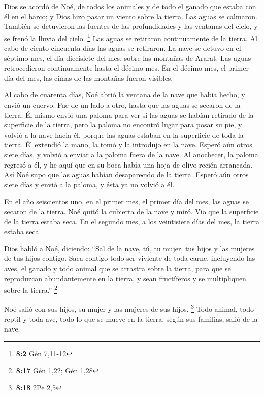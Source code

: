 \begin{paracol}{2}
 Dios se acordó de Noé, de todos los animales y de todo el
ganado que estaba con él en el barco; y Dios hizo pasar un viento sobre
la tierra. Las aguas se calmaron.  También se detuvieron
las fuentes de las profundidades y las ventanas del cielo, y se frenó la
lluvia del cielo. \footnote{\textbf{8:2} Gén 7,11-12}  Las
aguas se retiraron continuamente de la tierra. Al cabo de ciento
cincuenta días las aguas se retiraron.  La nave se detuvo
en el séptimo mes, el día diecisiete del mes, sobre las montañas de
Ararat.  Las aguas retrocedieron continuamente hasta el
décimo mes. En el décimo mes, el primer día del mes, las cimas de las
montañas fueron visibles.

 Al cabo de cuarenta días, Noé abrió la ventana de la nave
que había hecho,  y envió un cuervo. Fue de un lado a
otro, hasta que las aguas se secaron de la tierra.  Él
mismo envió una paloma para ver si las aguas se habían retirado de la
superficie de la tierra,  pero la paloma no encontró lugar
para posar su pie, y volvió a la nave hacia él, porque las aguas estaban
en la superficie de toda la tierra. Él extendió la mano, la tomó y la
introdujo en la nave.  Esperó aún otros siete días, y
volvió a enviar a la paloma fuera de la nave.  Al
anochecer, la paloma regresó a él, y he aquí que en su boca había una
hoja de olivo recién arrancada. Así Noé supo que las aguas habían
desaparecido de la tierra.  Esperó aún otros siete días y
envió a la paloma, y ésta ya no volvió a él.

 En el año seiscientos uno, en el primer mes, el primer
día del mes, las aguas se secaron de la tierra. Noé quitó la cubierta de
la nave y miró. Vio que la superficie de la tierra estaba seca.
 En el segundo mes, a los veintisiete días del mes, la
tierra estaba seca.

 Dios habló a Noé, diciendo:  ``Sal de la
nave, tú, tu mujer, tus hijos y las mujeres de tus hijos contigo.
 Saca contigo todo ser viviente de toda carne, incluyendo
las aves, el ganado y todo animal que se arrastra sobre la tierra, para
que se reproduzcan abundantemente en la tierra, y sean fructíferos y se
multipliquen sobre la tierra.'' \footnote{\textbf{8:17} Gén 1,22; Gén
  1,28}

 Noé salió con sus hijos, su mujer y las mujeres de sus
hijos. \footnote{\textbf{8:18} 2Pe 2,5}  Todo animal,
todo reptil y toda ave, todo lo que se mueve en la tierra, según sus
familias, salió de la nave.


\end{paracol}
